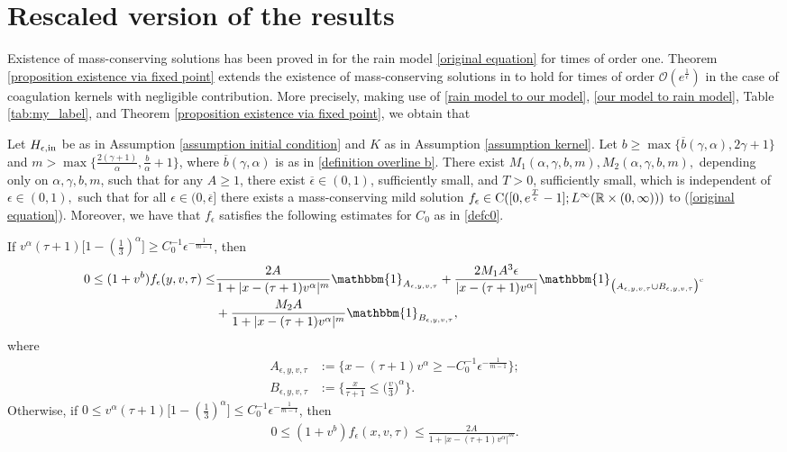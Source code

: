 \documentclass[11pt]{article}
\numberwithin{equation}{section}
\begin{document}
\section{Rescaled version of the results}\label{appendix rescaled version of the results}
Existence of mass-conserving solutions has been proved in \cite{cristianinhom} for the rain model \eqref{original equation} for times of order one.  Theorem \ref{proposition existence via fixed point} extends the existence of mass-conserving solutions in \cite{cristianinhom} to hold for times of order $\mathcal{O}(e^{\frac{1}{\epsilon}})$ in the case of coagulation kernels with negligible contribution. More precisely, making use of \eqref{rain model to our model}, \eqref{our model to rain model}, Table \ref{tab:my_label}, and Theorem \ref{proposition existence via fixed point}, we obtain that
\begin{prop}
 Let $H_{\epsilon,\textup{in}}$ be as in Assumption \ref{assumption initial condition} and $K$ as in Assumption \ref{assumption kernel}.  Let   $b
\geq \max\{\overline{b}(\gamma,\alpha),2\gamma+1\}$ and $m>\max\{\frac{2(\gamma+1)}{\alpha},\frac{b}{\alpha}+1\}$, where  $\overline{b}(\gamma,\alpha)$ is as in \eqref{definition overline b}.  There exist $M_{1}(\alpha,\gamma,b,m), M_{2}(\alpha,\gamma,b,m),$ depending only on $\alpha,\gamma,b,m$, such that for any $A\geq 1$, there exist $\overline{\epsilon}\in(0,1)$, sufficiently small, and  $T>0$, sufficiently small, which is independent of $\epsilon\in(0,1),$ such that  for all $\epsilon\in(0,\overline{\epsilon}]$ there exists a mass-conserving mild solution $f_{\epsilon}\in\textup{C}([0,e^{\frac{T}{\epsilon}}-1];L^{\infty}(\mathbb{R}\times(0,\infty)))$ to (\ref{original equation}). Moreover, we have that $f_{\epsilon}$ satisfies the following estimates for $C_{0}$ as in \eqref{defc0}.
   
If $v^{\alpha}(\tau+1)\big[1-(\frac{1}{3})^{\alpha}\big]\geq C_{0}^{-1}\epsilon^{-\frac{1}{m-1}}  $, then
    \begin{align}\label{converted bounds}
   0\leq (1+v^{b}) f_{\epsilon}(y,v,\tau)\leq &\frac{2A}{1+|x-(\tau+1)v^{\alpha}|^{m}}\mathbbm{1}_{ A_{\epsilon,y,v,\tau}}+\frac{2M_{1}A^{3}\epsilon}{|x-(\tau+1)v^{\alpha}|}\mathbbm{1}_{ \big(A_{\epsilon,y,v,\tau}\cup B_{\epsilon,y,v,\tau}\big)^{c}}\\
   &+\frac{M_{2}A}{1+|x-(\tau+1)v^{\alpha}|^{m}}\mathbbm{1}_{ B_{\epsilon,y,v,\tau}},\nonumber
    \end{align}
where
   \begin{align*}
       A_{\epsilon,y,v,\tau}&:=\{x-(\tau+1)v^{\alpha}\geq -C_{0}^{-1}\epsilon^{-\frac{1}{m-1}} \};\\
         B_{\epsilon,y,v,\tau}&:=\bigg\{\frac{x}{\tau+1}\leq \Big(\frac{v}{3}\Big)^{\alpha}\bigg\}.
   \end{align*}  Otherwise, if  $0\leq v^{\alpha}(\tau+1)\big[1-(\frac{1}{3})^{\alpha}\big]\leq C_{0}^{-1}\epsilon^{-\frac{1}{m-1}}  $, then
\begin{align}
   0\leq (1+v^{b}) f_{\epsilon}(x,v,\tau)\leq \frac{2A}{1+|x-(\tau+1)v^{\alpha}|^{m}}.
    \end{align}
\end{prop}
\end{document}
